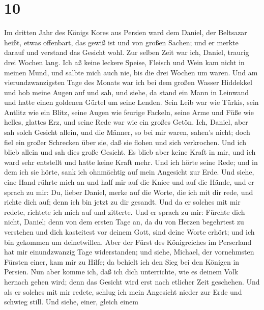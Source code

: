 \hypertarget{section-9}{%
\section{10}\label{section-9}}

 Im dritten Jahr des Königs Kores aus Persien ward dem
Daniel, der Beltsazar heißt, etwas offenbart, das gewiß ist und von
großen Sachen; und er merkte darauf und verstand das Gesicht wohl.
 Zur selben Zeit war ich, Daniel, traurig drei Wochen lang.
 Ich aß keine leckere Speise, Fleisch und Wein kam nicht in
meinen Mund, und salbte mich auch nie, bis die drei Wochen um waren.
 Und am vierundzwanzigsten Tage des Monats war ich bei dem
großen Wasser Hiddekkel  und hob meine Augen auf und sah,
und siehe, da stand ein Mann in Leinwand und hatte einen goldenen Gürtel
um seine Lenden.  Sein Leib war wie Türkis, sein Antlitz wie
ein Blitz, seine Augen wie feurige Fackeln, seine Arme und Füße wie
helles, glattes Erz, und seine Rede war wie ein großes Getön.
 Ich, Daniel, aber sah solch Gesicht allein, und die Männer,
so bei mir waren, sahen's nicht; doch fiel ein großer Schrecken über
sie, daß sie flohen und sich verkrochen.  Und ich blieb
allein und sah dies große Gesicht. Es blieb aber keine Kraft in mir, und
ich ward sehr entstellt und hatte keine Kraft mehr.  Und ich
hörte seine Rede; und in dem ich sie hörte, sank ich ohnmächtig auf mein
Angesicht zur Erde.  Und siehe, eine Hand rührte mich an
und half mir auf die Kniee und auf die Hände,  und er
sprach zu mir: Du, lieber Daniel, merke auf die Worte, die ich mit dir
rede, und richte dich auf; denn ich bin jetzt zu dir gesandt. Und da er
solches mit mir redete, richtete ich mich auf und zitterte.
 Und er sprach zu mir: Fürchte dich nicht, Daniel; denn von
dem ersten Tage an, da du von Herzen begehrtest zu verstehen und dich
kasteitest vor deinem Gott, sind deine Worte erhört; und ich bin
gekommen um deinetwillen.  Aber der Fürst des Königreiches
im Perserland hat mir einundzwanzig Tage widerstanden; und siehe,
Michael, der vornehmsten Fürsten einer, kam mir zu Hilfe; da behielt ich
den Sieg bei den Königen in Persien.  Nun aber komme ich,
daß ich dich unterrichte, wie es deinem Volk hernach gehen wird; denn
das Gesicht wird erst nach etlicher Zeit geschehen.  Und
als er solches mit mir redete, schlug ich mein Angesicht nieder zur Erde
und schwieg still.  Und siehe, einer, gleich einem
